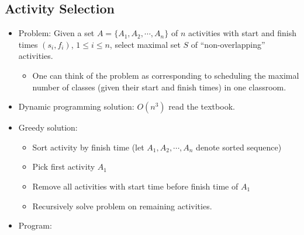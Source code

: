 \documentclass[11pt]{article}
\begin{document}
\subsection{Activity Selection}
\begin{itemize}
\item Problem: Given a set $A = \{A_1,A_2, \cdots ,A_n \}$ of $n$
activities with start and finish times $(s_i,f_i)$, $1 \leq i \leq n$,
select maximal set $S$ of ``non-overlapping'' activities.
        \begin{itemize}
        \item One can think of the problem as corresponding to scheduling
        the maximal number of classes (given their start and finish times)
        in one classroom.
        \end{itemize}
\item Dynamic programming solution: $O(n^3)$ read the textbook.
\item Greedy solution:
        \begin{itemize}
        \item Sort activity by finish time (let $A_1,A_2, \cdots ,A_n$
        denote sorted sequence)
        \item Pick first activity $A_1$
        \item Remove all activities with start time before finish time of $A_1$
        \item Recursively solve problem on remaining activities. 
        \end{itemize}


\item Program: \\ \\


\end{itemize}
\end{document}
